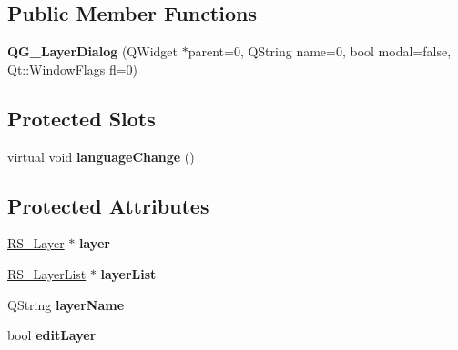 \subsection*{Public Member Functions}
\begin{DoxyCompactItemize}
\item 
\hypertarget{classQG__LayerDialog_a027f15dea25e906cd9d928a25d0259d7}{{\bfseries Q\-G\-\_\-\-Layer\-Dialog} (Q\-Widget $\ast$parent=0, Q\-String name=0, bool modal=false, Qt\-::\-Window\-Flags fl=0)}\label{classQG__LayerDialog_a027f15dea25e906cd9d928a25d0259d7}

\end{DoxyCompactItemize}
\subsection*{Protected Slots}
\begin{DoxyCompactItemize}
\item 
\hypertarget{classQG__LayerDialog_a9b8bb6ae092138b900130ecf86769924}{virtual void {\bfseries language\-Change} ()}\label{classQG__LayerDialog_a9b8bb6ae092138b900130ecf86769924}

\end{DoxyCompactItemize}
\subsection*{Protected Attributes}
\begin{DoxyCompactItemize}
\item 
\hypertarget{classQG__LayerDialog_a4972c45617a526784fe875860dba4ece}{\hyperlink{classRS__Layer}{R\-S\-\_\-\-Layer} $\ast$ {\bfseries layer}}\label{classQG__LayerDialog_a4972c45617a526784fe875860dba4ece}

\item 
\hypertarget{classQG__LayerDialog_a7e574f3d14d104901442158fe281b5eb}{\hyperlink{classRS__LayerList}{R\-S\-\_\-\-Layer\-List} $\ast$ {\bfseries layer\-List}}\label{classQG__LayerDialog_a7e574f3d14d104901442158fe281b5eb}

\item 
\hypertarget{classQG__LayerDialog_a394f9c8c3c18cca5eef4009faae3d8f7}{Q\-String {\bfseries layer\-Name}}\label{classQG__LayerDialog_a394f9c8c3c18cca5eef4009faae3d8f7}

\item 
\hypertarget{classQG__LayerDialog_a05d0622e093b304eafd196af2e022162}{bool {\bfseries edit\-Layer}}\label{classQG__LayerDialog_a05d0622e093b304eafd196af2e022162}

\end{DoxyCompactItemize}
